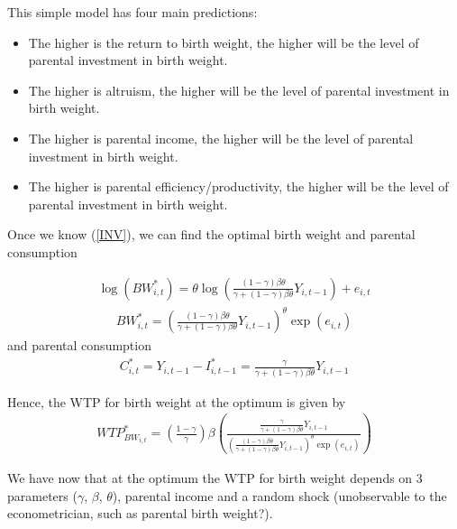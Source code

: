 \documentclass[a4paper, 11pt]{article}
\begin{document}
\begin{spacing}{1.4}
This simple model has four main predictions:
\begin{itemize}
\item The higher is the return to birth weight, the higher will be the level of parental investment in birth weight.
\item The higher is altruism, the higher will be the level of parental investment in birth weight.
\item The higher is parental income, the higher will be the level of parental investment in birth weight.
\item The higher is parental efficiency/productivity, the higher will be the level of parental investment in birth weight.
\end{itemize}
 
Once we know (\ref{INV}), we can find the optimal birth weight and parental consumption

\begin{align*}
\log(BW_{i,t}^*) = \theta \log \left(\frac{(1-\gamma) \beta \theta }{\gamma + (1-\gamma) \beta \theta} Y_{i,t-1} \right) + e_{i,t}
\end{align*}
\begin{align*}
BW_{i,t}^* = \left(\frac{(1-\gamma) \beta \theta }{\gamma + (1-\gamma) \beta \theta} Y_{i,t-1} \right)^{\theta} \exp(e_{i,t})
\end{align*}
and parental consumption
\begin{align*}
C_{i,t}^* = Y_{i,t-1} - I_{i,t-1}^* = \frac{\gamma}{\gamma + (1-\gamma) \beta \theta}Y_{i,t-1}
\end{align*}

Hence, the WTP for birth weight at the optimum is given by
\begin{align}\label{WTP1}
WTP_{BW_{i,t}}^*=   \left(\frac{1-\gamma}{\gamma}\right)\beta \left(\frac{\frac{\gamma}{\gamma + (1-\gamma) \beta \theta}Y_{i,t-1}}{\left(\frac{(1-\gamma) \beta \theta }{\gamma + (1-\gamma) \beta \theta} Y_{i,t-1} \right)^{\theta} \exp(e_{i,t})}\right)
\end{align}%

We have now that at the optimum the WTP for birth weight depends on 3 parameters ($\gamma$, $\beta$, $\theta$), parental income and a random shock (unobservable to the econometrician, such as parental birth weight?). 


\end{spacing}
\end{document}
